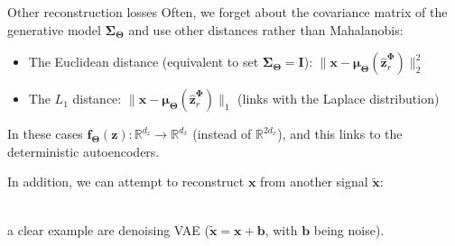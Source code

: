 \documentclass{beamer}
\newcommand{\bs}[1]{\boldsymbol{#1}}
\begin{document}
\begin{frame}{Other reconstruction losses}
 Often, we forget about the covariance matrix of the generative model $\bs{\Sigma}_{\bs{\Theta}}$ and use other distances rather than Mahalanobis:
 \begin{itemize}
  \item The Euclidean distance (equivalent to set $\bs{\Sigma}_{\bs{\Theta}}=\bs{I}$): $\lVert \bs{x}-\bs{\mu}_{\bs{\Theta}}(\hat{\bs{z}}_r^{\bs{\Phi}})\rVert^2_2$
  \item The $L_1$ distance: $\lVert \bs{x}-\bs{\mu}_{\bs{\Theta}}(\hat{\bs{z}}_r^{\bs{\Phi}})\rVert_1$ (links with the Laplace distribution)
 \end{itemize}

 In these cases $\bs{f}_{\bs{\Theta}}(\bs{z}):\mathbb{R}^{d_z}\rightarrow\mathbb{R}^{d_x}$ (instead of $\mathbb{R}^{2d_x}$), and this links to the deterministic autoencoders.\vspace{6mm}
 
 In addition, we can attempt to reconstruct $\bs{x}$ from another signal $\tilde{\bs{x}}$:
 \\
 a clear example are denoising VAE ($\tilde{\bs{x}}=\bs{x}+\bs{b}$, with $\bs{b}$ being noise).\vspace{-3mm}
\end{frame}
\end{document}
